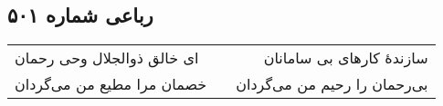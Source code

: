\begin{center}
\section*{رباعی شماره ۵۰۱}
\label{sec:sh501}
\begin{longtable}{l p{0.5cm} r}
ای خالق ذوالجلال وحی رحمان
&&
سازندهٔ کارهای بی سامانان
\\
خصمان مرا مطیع من می‌گردان
&&
بی‌رحمان را رحیم من می‌گردان
\\
\end{longtable}
\end{center}
